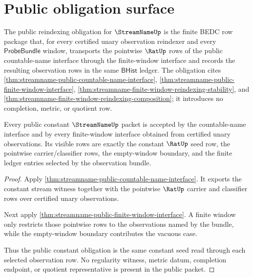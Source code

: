 \section{Public obligation surface}
\label{sec:streamname-public-obligation-surface}

\begin{definition}
\label{def:streamname-public-reindexing-obligation}
The public reindexing obligation for $\StreamNameUp$ is the finite BEDC row
package that, for every certified unary observation reindexer and every
$\mathsf{ProbeBundle}$ window, transports the pointwise $\RatUp$ rows of the
public countable-name interface through the finite-window interface and
records the resulting observation rows in the same $\mathsf{BHist}$ ledger.
The obligation cites
\autoref{thm:streamname-public-countable-name-interface},
\autoref{thm:streamname-public-finite-window-interface},
\autoref{thm:streamname-finite-window-reindexing-stability}, and
\autoref{thm:streamname-finite-window-reindexing-composition}; it introduces
no completion, metric, or quotient row.
\end{definition}

\begin{theorem}
\label{thm:streamname-public-constant-obligation}
Every public constant $\StreamNameUp$ packet is accepted by the countable-name
interface and by every finite-window interface obtained from certified unary
observations. Its visible rows are exactly the constant $\RatUp$ seed row, the
pointwise carrier/classifier rows, the empty-window boundary, and the finite
ledger entries selected by the observation bundle.
\end{theorem}
\begin{proof}
Apply \autoref{thm:streamname-public-countable-name-interface}. It exports the
constant stream witness together with the pointwise $\RatUp$ carrier and
classifier rows over certified unary observations.

Next apply \autoref{thm:streamname-public-finite-window-interface}. A finite
window only restricts those pointwise rows to the observations named by the
bundle, while the empty-window boundary contributes the vacuous case.

Thus the public constant obligation is the same constant seed read through
each selected observation row. No regularity witness, metric datum, completion
endpoint, or quotient representative is present in the public packet.
\end{proof}

